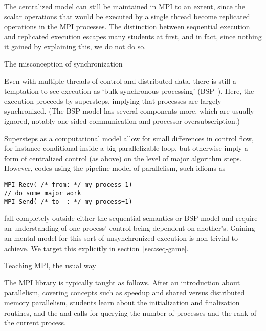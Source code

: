 \begin{comment}
  The combination of single thread of control, but distributed data, we
  identified above as `sequential
  semantics'~\cite{Nikhil:ph-book}. While this is a feasible model for
  parallel execution, it leads to idioms such as 
\begin{verbatim}
for (p=0; p<nprocs; p++)
  if (p==myrank)
    // do some function of p
\end{verbatim}
when the code needs to distinguish between processes.
\end{comment}

The centralized model can still be maintained in MPI to an extent, since
the scalar operations that would be executed by a single thread
become replicated operations in the MPI processes.
The distinction between sequential execution and
replicated execution escapes many students at first, and in fact,
since nothing it gained by explaining this, we do not do so.

 {The misconception of synchronization}

Even with multiple threads of control and distributed data, there is
still a temptation to see execution as `bulk
synchronous processing' (BSP~\cite{Valiant:1990:BSP}).
Here, the execution proceeds by supersteps, implying that processes
are largely synchronized. (The BSP model has several components more,
which are usually ignored, notably one-sided communication and processor
oversubscription.)

Supersteps as a computational model allow for small
differences in control flow, for instance conditional inside a big
parallelizable loop, but otherwise imply a form of centralized control
(as above) on the level of major algorithm steps.
However, codes  using the pipeline model of parallelism, such idioms as
\begin{verbatim}
MPI_Recv( /* from: */ my_process-1)
// do some major work
MPI_Send( /* to  : */ my_process+1)
\end{verbatim}
fall completely outside either the sequential semantics or BSP model
and require an understanding of one process' control being dependent
on another's.
%
Gaining an mental model for this sort of unsynchronized execution is
non-trivial to achieve. We target this explicitly in
section~\ref{sec:seq-game}.

 {Teaching MPI, the usual way}
\label{sec:mpi-usual}

The \ac{MPI} library is typically taught as follows.  After an
introduction about parallelism, covering concepts such as speedup
and shared versus distributed memory parallelism, students learn about
the initialization and finalization routines, and the
 and  calls for querying the number
of processes and the rank of the current process.

